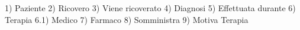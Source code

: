 \documentclass{article}
\begin{document}
1) Paziente
2) Ricovero
3) Viene ricoverato
4) Diagnosi
5) Effettuata durante 
6) Terapia 
6.1) Medico
7) Farmaco 
8) Somministra 
9) Motiva Terapia 
\end{document}
